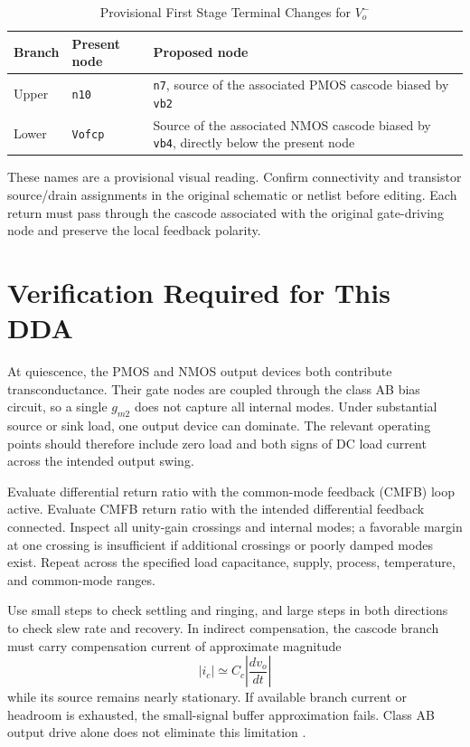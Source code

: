 \documentclass[10pt,journal]{IEEEtran}
\begin{document}
\begin{table}[t]
\caption{Provisional First Stage Terminal Changes for $V_o^-$}
\label{tab:nodes}
\centering
\small
\setlength{\tabcolsep}{4pt}
\begin{tabular}{@{}p{}p{}p{}@{}}
\toprule
Branch & Present node & Proposed node\\
\midrule
Upper & \texttt{n10} & \texttt{n7}, source of the associated PMOS cascode biased by \texttt{vb2}\\[4pt]
Lower & \texttt{Vofcp} & Source of the associated NMOS cascode biased by \texttt{vb4}, directly below the present node\\
\bottomrule
\end{tabular}
\end{table}

These names are a provisional visual reading. Confirm connectivity and transistor source/drain assignments in the original schematic or netlist before editing. Each return must pass through the cascode associated with the original gate-driving node and preserve the local feedback polarity.

\balance
\section{Verification Required for This DDA}
At quiescence, the PMOS and NMOS output devices both contribute transconductance. Their gate nodes are coupled through the class AB bias circuit, so a single $g_{m2}$ does not capture all internal modes. Under substantial source or sink load, one output device can dominate. The relevant operating points should therefore include zero load and both signs of DC load current across the intended output swing.

Evaluate differential return ratio with the common-mode feedback (CMFB) loop active. Evaluate CMFB return ratio with the intended differential feedback connected. Inspect all unity-gain crossings and internal modes; a favorable margin at one crossing is insufficient if additional crossings or poorly damped modes exist. Repeat across the specified load capacitance, supply, process, temperature, and common-mode ranges.

Use small steps to check settling and ringing, and large steps in both directions to check slew rate and recovery. In indirect compensation, the cascode branch must carry compensation current of approximate magnitude
\begin{equation}
 |i_c|\simeq C_c\left|\frac{dv_o}{dt}\right|
\end{equation}
while its source remains nearly stationary. If available branch current or headroom is exhausted, the small-signal buffer approximation fails. Class AB output drive alone does not eliminate this limitation \cite{saxena2007}.
\end{document}

